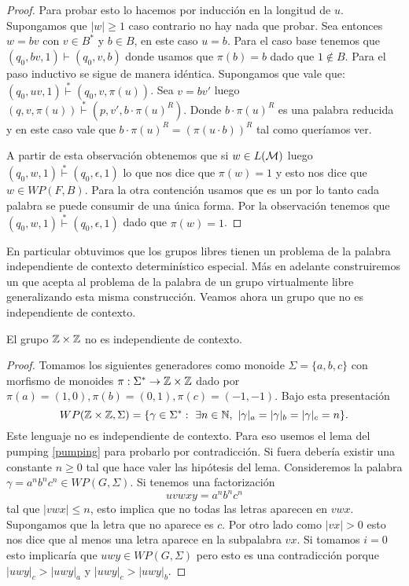 \documentclass[tesis.tex]{subfiles}
\begin{document}
\begin{proof}
	Para probar esto lo hacemos por inducción en la longitud de $u$.
	Supongamos que $|w| \ge 1$ caso contrario no hay nada que probar.
	Sea entonces $w = bv$ con $v \in B^*$ y $b \in B$, en este caso $u = b$.
	Para el caso base tenemos que $(q_{0},bv,1) \vdash (q_{0},v,b)$ donde usamos que $\pi(b) = b$ dado que $1 \notin B$.
	Para el paso inductivo se sigue de manera idéntica.
	Supongamos que vale que: \newline			
	$(q_{0},uv,1) \overset{*}{\vdash} (q_{0}, v, \pi(u))$.
	Sea $v=bv'$ luego $(q,v,\pi(u)) \overset{*}{\vdash} (p,v',b \cdot \pi(u)^R)$.
	Donde $b \cdot \pi(u)^R$ es una palabra reducida y en este caso vale que $b \cdot \pi(u)^R = (\pi(u \cdot b))^R$ tal como queríamos ver.
	
	
	A partir de esta observación obtenemos que si $w \in L(\cal M)$ luego 
	$(q_{0},w,1) \overset{*}{\vdash} (q_{0},\epsilon,1)$ lo que nos dice que $\pi(w) = 1$ y esto nos dice que $w \in WP(F, B)$.
	Para la otra contención usamos que es un \APD por lo tanto cada palabra se puede consumir de una única forma.
	Por la observación tenemos que $(q_{0},w,1) \overset{*}{\vdash} (q_{0},\epsilon,1)$ dado que $\pi(w) = 1$.
\end{proof}

En particular obtuvimos que los grupos libres tienen un problema de la palabra independiente de contexto determinístico especial.
Más en adelante construiremos un \APD que acepta al problema de la palabra de un grupo virtualmente libre generalizando esta misma construcción.
Veamos ahora un grupo que no es independiente de contexto.

\begin{prop}
	El grupo $\mathbb{Z} \times \mathbb{Z}$ no es independiente de contexto.
\end{prop}

\begin{proof}
	Tomamos los siguientes generadores como monoide $\Sigma = \{ a,b,c \}$ con morfismo de monoides $\pi: \Sigma^* \to \mathbb{Z} \times \mathbb{Z}$ dado por $\pi(a)=(1,0), \pi(b)=(0,1), \pi(c)=(-1,-1)$.
	Bajo esta presentación 
	\[
	WP(\mathbb{Z} \times \mathbb{Z}, \Sigma) = \{ \gamma \in \Sigma^*  : \ \exists n \in \mathbb{N}, \ |\gamma|_a = |\gamma|_b = |\gamma|_c = n \}.
	\]
	Este lenguaje no es independiente de contexto.
	Para eso usemos el lema del pumping \ref{pumping} para probarlo por contradicción.
	Si fuera \ic debería existir una constante $n \ge 0$ tal que hace valer las hipótesis del lema.
	Consideremos la palabra $\gamma = a^n b^n c^n \in WP(G, \Sigma)$.
	Si tenemos una factorización 
	\[
	uvwxy = a^nb^nc^n
	\]
	tal que $|vwx| \le n$, esto implica que no todas las letras aparecen en $vwx$.
	Supongamos que la letra que no aparece es $c$.
	Por otro lado como $|vx| > 0$ esto nos dice que al menos una letra aparece en la subpalabra $vx$.
	Si tomamos $i=0$ esto implicaría que $uwy \in WP(G,\Sigma)$ pero esto es una contradicción porque $|uwy|_{c} > |uwy|_{a}$ y $|uwy|_{c} > |uwy|_{b}$.
\end{proof}
 
\end{document}
